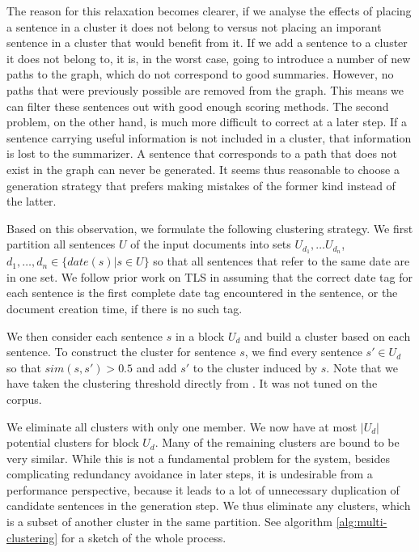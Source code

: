 \documentclass[a4paper,BCOR=10mm]{report}
\numberwithin{lemma}{chapter}
\numberwithin{definition}{chapter}
\begin{document}
The reason for this relaxation becomes clearer, if we analyse the effects of placing a sentence in a cluster it does not belong to versus not placing an imporant sentence in a cluster that would benefit from it.
If we add a sentence to a cluster it does not belong to, it is, in the worst case, going to introduce a number of new paths to the graph, which do not correspond to good summaries. However, no paths that were previously possible are removed from the graph. This means we can filter these sentences out with good enough scoring methods.
The second problem, on the other hand, is much more difficult to correct at a later step. If a sentence carrying useful information is not included in a cluster, that information is lost to the summarizer. A sentence that corresponds to a path that does not exist in the graph can never be generated. It seems thus reasonable to choose a generation strategy that prefers making mistakes of the former kind instead of the latter.

Based on this observation, we formulate the following clustering strategy. We first partition all sentences $U$ of the input documents into sets $U_{d_1}, \dots U_{d_n}$, $d_1, \dots, d_n \in \{ date(s) | s \in U \}$ so that all sentences that refer to the same date are in one set. We follow prior work on TLS \citep{chieu, markert} in assuming that the correct date tag for each sentence is the first complete date tag encountered in the sentence, or the document creation time, if there is no such tag. %

We then consider each sentence $s$ in a block $U_d$ and build a cluster based on each sentence.
To construct the cluster for sentence $s$, we find every sentence $s' \in U_d$ so that $\mathit{sim}(s, s') > 0.5$ and add $s'$ to the cluster induced by $s$. Note that we have taken the clustering threshold directly from \citet{banerjee}. It was not tuned on the corpus.

We eliminate all clusters with only one member. We now have at most $|U_d|$ potential clusters for block $U_d$.
Many of the remaining clusters are bound to be very similar. While this is not a fundamental problem for the system, besides complicating redundancy avoidance in later steps, it is undesirable from a performance perspective, because it leads to a lot of unnecessary duplication of candidate sentences in the generation step.
We thus eliminate any clusters, which is a subset of another cluster in the same partition. See algorithm \ref{alg:multi-clustering} for a sketch of the whole process.
\end{document}
